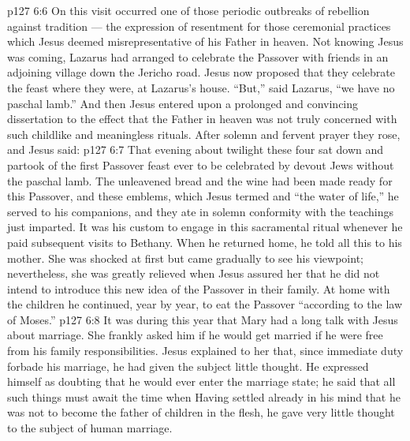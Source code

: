 \vs p127 6:6 On this visit occurred one of those periodic outbreaks of rebellion against tradition --- the expression of resentment for those ceremonial practices which Jesus deemed misrepresentative of his Father in heaven. Not knowing Jesus was coming, Lazarus had arranged to celebrate the Passover with friends in an adjoining village down the Jericho road. Jesus now proposed that they celebrate the feast where they were, at Lazarus’s house. “But,” said Lazarus, “we have no paschal lamb.” And then Jesus entered upon a prolonged and convincing dissertation to the effect that the Father in heaven was not truly concerned with such childlike and meaningless rituals. After solemn and fervent prayer they rose, and Jesus said: 
\vs p127 6:7 That evening about twilight these four sat down and partook of the first Passover feast ever to be celebrated by devout Jews without the paschal lamb. The unleavened bread and the wine had been made ready for this Passover, and these emblems, which Jesus termed  and “the water of life,” he served to his companions, and they ate in solemn conformity with the teachings just imparted. It was his custom to engage in this sacramental ritual whenever he paid subsequent visits to Bethany. When he returned home, he told all this to his mother. She was shocked at first but came gradually to see his viewpoint; nevertheless, she was greatly relieved when Jesus assured her that he did not intend to introduce this new idea of the Passover in their family. At home with the children he continued, year by year, to eat the Passover “according to the law of Moses.”
\vs p127 6:8 \pc It was during this year that Mary had a long talk with Jesus about marriage. She frankly asked him if he would get married if he were free from his family responsibilities. Jesus explained to her that, since immediate duty forbade his marriage, he had given the subject little thought. He expressed himself as doubting that he would ever enter the marriage state; he said that all such things must await  the time when  Having settled already in his mind that he was not to become the father of children in the flesh, he gave very little thought to the subject of human marriage.
